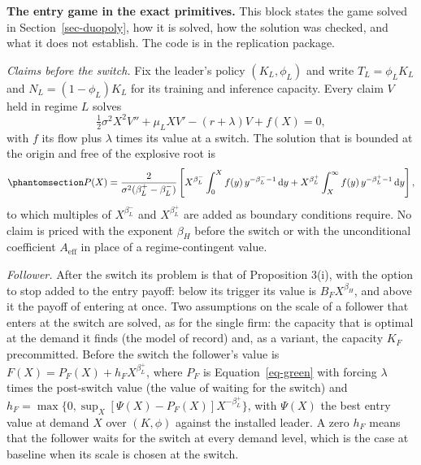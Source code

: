 \documentclass[
  11pt,
  letterpaper,
]{scrartcl}
\begin{document}
\textbf{The entry game in the exact primitives.} This block states the
game solved in Section~\ref{sec-duopoly}, how it is solved, how the
solution was checked, and what it does not establish. The code is in the
replication package.

\emph{Claims before the switch.} Fix the leader's policy
\((K_L, \phi_L)\) and write \(T_L = \phi_L K_L\) and
\(N_L = (1-\phi_L)K_L\) for its training and inference capacity. Every
claim \(V\) held in regime \(L\) solves \[
\tfrac{1}{2}\sigma^2 X^2 V'' + \mu_L X V' - (r + \lambda)V + f(X) = 0,
\] with \(f\) its flow plus \(\lambda\) times its value at a switch. The
solution that is bounded at the origin and free of the explosive root is
\begin{equation}\protect\phantomsection\label{eq-green}{
P(X) = \frac{2}{\sigma^2(\beta_L^+ - \beta_L^-)}\left[X^{\beta_L^-}\int_0^X f(y)\,y^{-\beta_L^- - 1}\,\mathrm{d}y + X^{\beta_L^+}\int_X^\infty f(y)\,y^{-\beta_L^+ - 1}\,\mathrm{d}y\right],
}\end{equation} to which multiples of \(X^{\beta_L^-}\) and
\(X^{\beta_L^+}\) are added as boundary conditions require. No claim is
priced with the exponent \(\beta_H\) before the switch or with the
unconditional coefficient \(A_{\text{eff}}\) in place of a
regime-contingent value.

\emph{Follower.} After the switch its problem is that of Proposition
3(i), with the option to stop added to the entry payoff: below its
trigger its value is \(B_F X^{\beta_H}\), and above it the payoff of
entering at once. Two assumptions on the scale of a follower that enters
at the switch are solved, as for the single firm: the capacity that is
optimal at the demand it finds (the model of record) and, as a variant,
the capacity \(K_F\) precommitted. Before the switch the follower's
value is \(F(X) = P_F(X) + h_F X^{\beta_L^+}\), where \(P_F\) is
Equation~\ref{eq-green} with forcing \(\lambda\) times the post-switch
value (the value of waiting for the switch) and
\(h_F = \max\{0, \sup_X [\Psi(X) - P_F(X)]X^{-\beta_L^+}\}\), with
\(\Psi(X)\) the best entry value at demand \(X\) over \((K, \phi)\)
against the installed leader. A zero \(h_F\) means that the follower
waits for the switch at every demand level, which is the case at
baseline when its scale is chosen at the switch.
\end{document}
